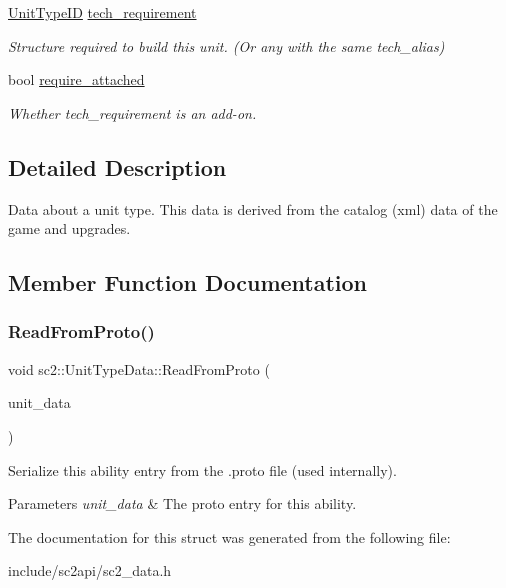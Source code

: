 \begin{DoxyCompactItemize}
\mbox{\label{structsc2_1_1_unit_type_data_acd5714a07964d41b8af883d6b230e38e}} 
\hyperlink{classsc2_1_1_s_c2_type}{Unit\+Type\+ID} \hyperlink{structsc2_1_1_unit_type_data_acd5714a07964d41b8af883d6b230e38e}{tech\+\_\+requirement}
\begin{DoxyCompactList}\small\item\em Structure required to build this unit. (Or any with the same tech\+\_\+alias) \end{DoxyCompactList}\item 
\mbox{\label{structsc2_1_1_unit_type_data_a71172b93c9f9ec00c82b81adce596d00}} 
bool \hyperlink{structsc2_1_1_unit_type_data_a71172b93c9f9ec00c82b81adce596d00}{require\+\_\+attached}
\begin{DoxyCompactList}\small\item\em Whether tech\+\_\+requirement is an add-\/on. \end{DoxyCompactList}\end{DoxyCompactItemize}


\subsection{Detailed Description}
Data about a unit type. This data is derived from the catalog (xml) data of the game and upgrades. 

\subsection{Member Function Documentation}
\mbox{\label{structsc2_1_1_unit_type_data_a4d05b07420d5c202b9f397968428254d}} 
\subsubsection{\texorpdfstring{Read\+From\+Proto()}{ReadFromProto()}}
{\footnotesize\ttfamily void sc2\+::\+Unit\+Type\+Data\+::\+Read\+From\+Proto (\begin{DoxyParamCaption}\item[{const S\+C2\+A\+P\+I\+Protocol\+::\+Unit\+Type\+Data \&}]{unit\+\_\+data }\end{DoxyParamCaption})}

Serialize this ability entry from the .proto file (used internally). 
\begin{DoxyParams}{Parameters}
{\em unit\+\_\+data} & The proto entry for this ability. \\
\hline
\end{DoxyParams}


The documentation for this struct was generated from the following file\+:\begin{DoxyCompactItemize}
\item 
include/sc2api/sc2\+\_\+data.\+h\end{DoxyCompactItemize}
